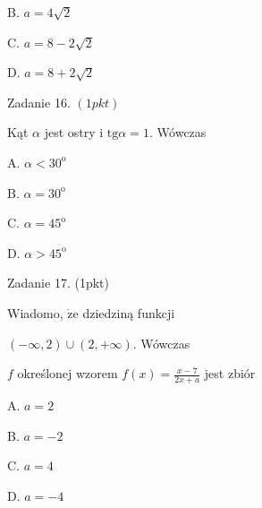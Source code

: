 \documentclass[a4paper,12pt]{article}
\begin{document}
B. $a=4\sqrt{2}$

C. $a=8-2\sqrt{2}$

D. $a=8+2\sqrt{2}$

Zadanie 16. $(1pkt)$

Kąt $\alpha$ jest ostry i $\mathrm{t}\mathrm{g}\alpha=1$. Wówczas

A. $\alpha<30^{\mathrm{o}}$

B. $\alpha=30^{\mathrm{o}}$

C. $\alpha=45^{\mathrm{o}}$

D. $\alpha>45^{\mathrm{o}}$

Zadanie 17. (1pkt)

Wiadomo, $\dot{\mathrm{z}}\mathrm{e}$ dziedziną funkcji

$(-\infty,2)\cup(2,+\infty)$. Wówczas

$f$ określonej wzorem $f(x)=\displaystyle \frac{x-7}{2x+a}$ jest zbiór

A. $a=2$

B. $a=-2$

C. $a=4$

D. $a=-4$
\end{document}
